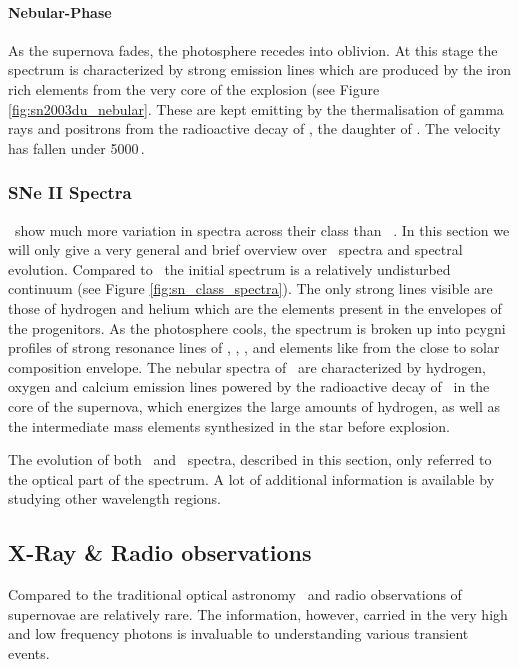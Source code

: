 \paragraph{Nebular-Phase}
As the supernova fades, the photosphere recedes into oblivion. At this stage the spectrum is characterized by strong emission lines which are produced by the iron rich elements from the very core of the explosion (see Figure \ref{fig:sn2003du_nebular}. These are kept emitting by the thermalisation of gamma rays and positrons from the radioactive decay of , the daughter of . The velocity has fallen under 5000\,\kms. 




\subsubsection{SNe II Spectra}
\sneii\ show much more variation in spectra across their class than \sneia\ . In this section we will only give a very general and brief overview over \sneii\ spectra and spectral evolution. 
Compared to \sneia\ the initial spectrum is a relatively undisturbed continuum (see Figure \ref{fig:sn_class_spectra}). The only strong lines visible are those of hydrogen and helium which are the elements present in the envelopes of the progenitors. 
As the photosphere cools, the spectrum is broken up into \Gls{pcygni} profiles of strong resonance lines of , , , and elements like  from the close to solar composition envelope. The nebular spectra of \sneii\ are characterized by hydrogen, oxygen and calcium emission lines powered by the radioactive decay of \Ni\ in the core of the supernova, which energizes the large amounts of hydrogen, as well as the intermediate mass elements synthesized in the star before explosion.

The evolution of both \sneia\ and \sneii\ spectra, described in this section, only referred to the optical part of the spectrum. A lot of additional information is available by studying other wavelength regions.

\subsection{X-Ray \& Radio observations}

Compared to the traditional optical astronomy \xray\ and radio observations of supernovae are relatively rare. The information, however, carried in the very high and low frequency photons is invaluable to understanding various transient events. 

